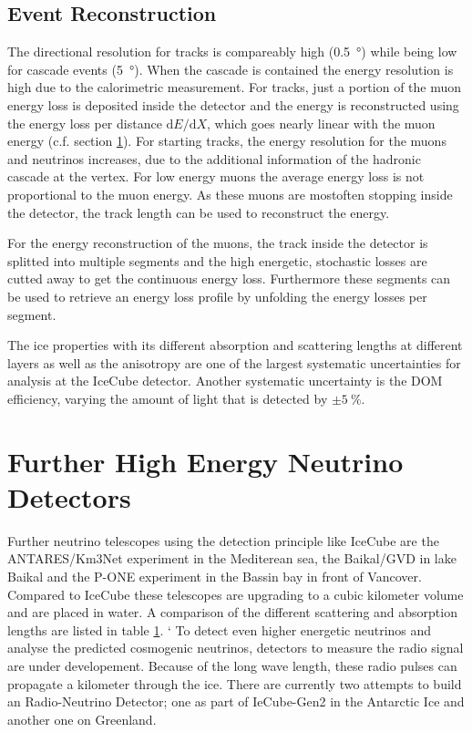 \subsection{Event Reconstruction}

The directional resolution for tracks is compareably high (\SI{0.5}{\degree}) while being low for cascade events (\SI{5}{\degree}).
When the cascade is contained the energy resolution is high due to the calorimetric measurement.
For tracks, just a portion of the muon energy loss is deposited inside the detector and the energy is reconstructed using the energy loss per distance $\mathrm{d}E/\mathrm{d}X$, which goes nearly linear with the muon energy (c.f. section \ref{}).
For starting tracks, the energy resolution for the muons and neutrinos increases, due to the additional information of the hadronic cascade at the vertex.
For low energy muons the average energy loss is not proportional to the muon energy.
As these muons are mostoften stopping inside the detector, the track length can be used to reconstruct the energy.

For the energy reconstruction of the muons, the track inside the detector is splitted into multiple segments and the high energetic, stochastic losses are cutted away to get the continuous energy loss.
Furthermore these segments can be used to retrieve an energy loss profile by unfolding the energy losses per segment.

The ice properties with its different absorption and scattering lengths at different layers as well as the anisotropy are one of the largest systematic uncertainties for analysis at the IceCube detector.
Another systematic uncertainty is the DOM efficiency, varying the amount of light that is detected by $\pm\SI{5}{\percent}$.

\section{Further High Energy Neutrino Detectors}

Further neutrino telescopes using the detection principle like IceCube are the ANTARES/Km3Net experiment in the Mediterean sea, the Baikal/GVD in lake Baikal and the P-ONE experiment in the Bassin bay in front of Vancover.
Compared to IceCube these telescopes are upgrading to a cubic kilometer volume and are placed in water.
A comparison of the different scattering and absorption lengths are listed in table \ref{}.
`
To detect even higher energetic neutrinos and analyse the predicted cosmogenic neutrinos, detectors to measure the radio signal are under developement.
Because of the long wave length, these radio pulses can propagate a kilometer through the ice.
There are currently two attempts to build an Radio-Neutrino Detector; one as part of IeCube-Gen2 in the Antarctic Ice and another one on Greenland.

